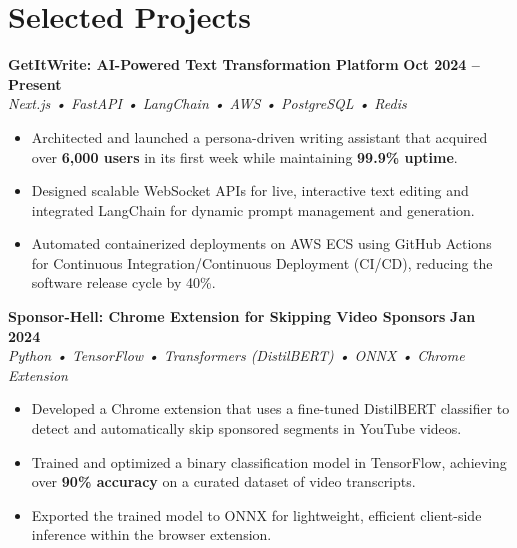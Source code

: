 \documentclass[letterpaper,10pt]{article}
\newcommand{\projecttitle}[1]{{\large\bfseries\color{black} #1}}
\newcommand{\projecttech}[1]{{\itshape\color{graytext} #1}}
\newcommand{\projectdate}[1]{{\small\bfseries #1}}
\newcommand{\projectlink}[2]{\href{#2}{\small #1}\hspace{1em}}
\begin{document}
\section{Selected Projects}

\projecttitle{GetItWrite: AI-Powered Text Transformation Platform} \projectlink{\faGlobe}{https://www.getitwrite.in} \hfill \projectdate{Oct 2024 -- Present}\\
\projecttech{Next.js • FastAPI • LangChain • AWS • PostgreSQL • Redis}
\begin{itemize}[leftmargin=*,noitemsep]
\item Architected and launched a persona-driven writing assistant that acquired over \textbf{6,000 users} in its first week while maintaining \textbf{99.9\% uptime}.
\item Designed scalable WebSocket APIs for live, interactive text editing and integrated LangChain for dynamic prompt management and generation.
\item Automated containerized deployments on AWS ECS using GitHub Actions for Continuous Integration/Continuous Deployment (CI/CD), reducing the software release cycle by 40\%.
\end{itemize}

\vspace{4pt} %

\projecttitle{Sponsor-Hell: Chrome Extension for Skipping Video Sponsors} \projectlink{\faGithub}{https://github.com/krishnabansal89/Sponsor-Hell} \hfill \projectdate{Jan 2024}\\
\projecttech{Python • TensorFlow • Transformers (DistilBERT) • ONNX • Chrome Extension}
\begin{itemize}[leftmargin=*,noitemsep]
\item Developed a Chrome extension that uses a fine-tuned DistilBERT classifier to detect and automatically skip sponsored segments in YouTube videos.
\item Trained and optimized a binary classification model in TensorFlow, achieving over \textbf{90\% accuracy} on a curated dataset of video transcripts.
\item Exported the trained model to ONNX for lightweight, efficient client-side inference within the browser extension.
\end{itemize}

\vspace{4pt} %
\end{document}
